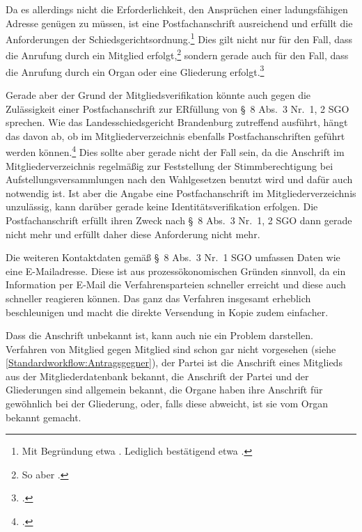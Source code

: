 Da es allerdings nicht die Erforderlichkeit, den Ansprüchen einer ladungsfähigen Adresse genügen zu müssen, ist eine Postfachanschrift ausreichend und erfüllt die Anforderungen der Schiedsgerichtsordnung.\footnote{Mit Begründung etwa \cites[3]{BSG20130715}[S.~4 Rn~16]{LSGBB145}{LSGBB134}. Lediglich bestätigend etwa \cites[7]{LSGBB133}[S.~10~f. Rn~48]{LSGBB146}.}
Dies gilt nicht nur für den Fall, dass die Anrufung durch ein Mitglied erfolgt,\footnote{So aber \cites[S.~1]{LSGBB134}.} sondern gerade auch für den Fall, dass die Anrufung durch ein Organ oder eine Gliederung erfolgt.\footnote{\cites[S.~2~f.]{BSG20131230}.}

Gerade aber der Grund der Mitgliedsverifikation könnte auch gegen die Zulässigkeit einer Postfachanschrift zur ERfüllung von \S~8 Abs.~3 Nr.~1, 2 SGO sprechen.
Wie das Landesschiedsgericht Brandenburg zutreffend ausführt, hängt das davon ab, ob im Mitgliederverzeichnis ebenfalls Postfachanschriften geführt werden können.\footnote{\cites[S.~4 Rn~16]{LSGBB145}.}
Dies sollte aber gerade nicht der Fall sein, da die Anschrift im Mitgliederverzeichnis regelmäßig zur Feststellung der Stimmberechtigung bei Aufstellungsversammlungen nach den Wahlgesetzen benutzt wird und dafür auch notwendig ist.
Ist aber die Angabe eine Postfachanschrift im Mitgliederverzeichnis unzulässig, kann darüber gerade keine Identitätsverifikation erfolgen.
Die Postfachanschrift erfüllt ihren Zweck nach \S~8 Abs.~3 Nr.~1, 2 SGO dann gerade nicht mehr und erfüllt daher diese Anforderung nicht mehr.

Die weiteren Kontaktdaten gemäß \S~8 Abs.~3 Nr.~1 SGO umfassen Daten wie eine E-Mailadresse. Diese ist aus prozessökonomischen Gründen sinnvoll, da ein Information per E-Mail die Verfahrensparteien schneller erreicht und diese auch schneller reagieren können. Das ganz das Verfahren insgesamt erheblich beschleunigen und macht die direkte Versendung in Kopie zudem einfacher.

Dass die Anschrift unbekannt ist, kann auch nie ein Problem darstellen. Verfahren von Mitglied gegen Mitglied sind schon gar nicht vorgesehen (siehe \ref{Standardworkflow:Antragsgegner}), der Partei ist die Anschrift eines Mitglieds aus der Mitgliederdatenbank bekannt, die Anschrift der Partei und der Gliederungen sind allgemein bekannt, die Organe haben ihre Anschrift für gewöhnlich bei der Gliederung, oder, falls diese abweicht, ist sie vom Organ bekannt gemacht.

